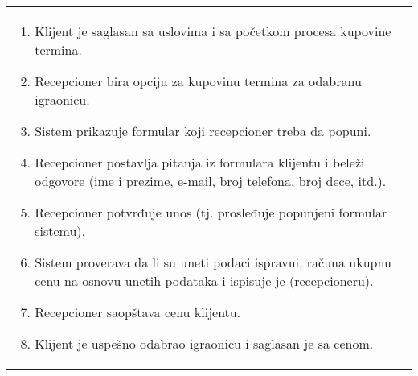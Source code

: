 \documentclass[../../main.tex]{subfiles}
\begin{document}
\begin{longtable}{| p{} | p{} |}
\begin{enumerate}
        \item Klijent je saglasan sa uslovima i sa početkom procesa kupovine termina.
        \item Recepcioner bira opciju za kupovinu termina za odabranu igraonicu.
        \item Sistem prikazuje formular koji recepcioner treba da popuni.
        \item Recepcioner postavlja pitanja iz formulara klijentu i beleži odgovore (ime i prezime, e-mail, broj telefona, broj dece, itd.).
        \item Recepcioner potvrđuje unos (tj. prosleđuje popunjeni formular sistemu).
        \item Sistem proverava da li su uneti podaci ispravni, računa ukupnu cenu na osnovu unetih podataka i ispisuje je (recepcioneru).
        \item Recepcioner saopštava cenu klijentu.
        \item Klijent je uspešno odabrao igraonicu i saglasan je sa cenom. %
        

\end{enumerate}
\end{longtable}
\end{document}
